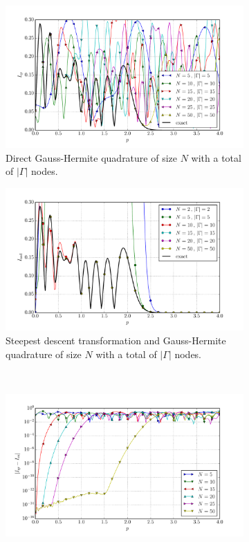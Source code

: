 \documentclass[a4paper,10pt]{article}
\begin{document}
\begin{figure}[ht!]
  \begin{subfigure}[t]{0.5\linewidth}
    \includegraphics[width=\linewidth]{./plots/tp_1d_conv_p_11_9_val_qr.pdf}
    \caption{Direct Gauss-Hermite quadrature of size $N$ with a total of $|\Gamma|$ nodes.}
    \label{fig:tp_1d_conv_p_11_9_val_qr}
  \end{subfigure}
  \begin{subfigure}[t]{0.5\linewidth}
    \includegraphics[width=\linewidth]{./plots/tp_1d_conv_p_11_9_val_nsd.pdf}
    \caption{Steepest descent transformation and Gauss-Hermite quadrature of size $N$ with a total of $|\Gamma|$ nodes.}
    \label{fig:tp_1d_conv_p_11_9_val_nsd}
  \end{subfigure} \\
  \begin{subfigure}[t]{0.5\linewidth}
    \includegraphics[width=\linewidth]{./plots/tp_1d_conv_p_11_9_err_qr.pdf}

\end{subfigure}
\end{figure}
\end{document}
